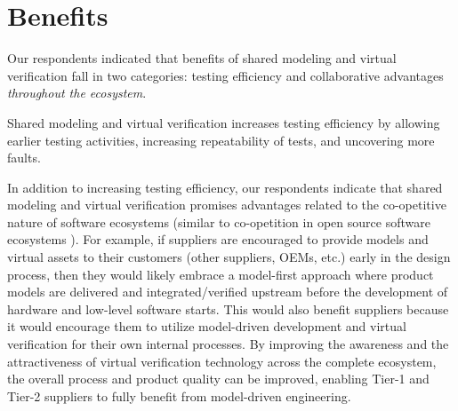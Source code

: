 \section{Benefits} \label{sec:benefits}
Our respondents indicated that %
benefits of shared modeling and virtual verification fall in two categories:
testing efficiency and collaborative advantages \emph{throughout the ecosystem}.

Shared modeling and virtual verification increases testing efficiency by allowing earlier testing activities, increasing repeatability of tests, and uncovering more faults. 


In addition to increasing testing efficiency, our respondents indicate that shared modeling and virtual verification promises advantages related to the co-opetitive nature of software ecosystems (similar to co-opetition in open source software ecosystems \cite{Agerfalk2008}).
%
%
For example, if suppliers are encouraged to provide models and virtual assets to their customers (other suppliers, OEMs, etc.) early in the design process, then they would likely embrace a model-first approach where product models are delivered and integrated/verified upstream before the development of hardware and low-level software starts.
This would also benefit suppliers because it would encourage them to utilize model-driven development and virtual verification for their own internal processes.
By improving the awareness and the attractiveness of virtual verification technology across the complete ecosystem, the overall process and product quality can be improved, enabling Tier-1 and Tier-2 suppliers to fully benefit from model-driven engineering.

